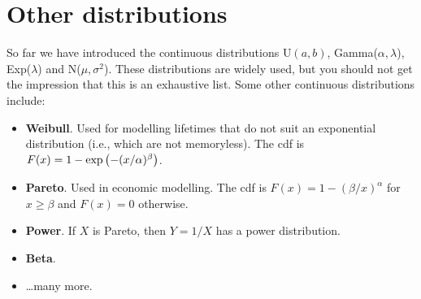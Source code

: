 \section{Other distributions}
So far we have introduced the continuous distributions U$(a,b)$, Gamma($\alpha,\lambda$), Exp($\lambda$) and N($\mu,\sigma^2$). These distributions are widely used, but you should not get the impression that this is an exhaustive list. Some other continuous distributions include:
\begin{itemize}
\item \textbf{Weibull}. Used for modelling lifetimes that do not suit an exponential distribution (i.e., which are not memoryless). The cdf is $F(x) = 1 - \exp\left(-(x/\alpha)^\beta\right)$.
\item \textbf{Pareto}. Used in economic modelling. The cdf is $F(x) = 1 - (\beta/x)^\alpha$ for $x \geq \beta$ and $F(x) = 0$ otherwise.
\item \textbf{Power}. If $X$ is Pareto, then $Y = 1/X$ has a power distribution.
\item \textbf{Beta}.
\item \ldots many more.
\end{itemize}

